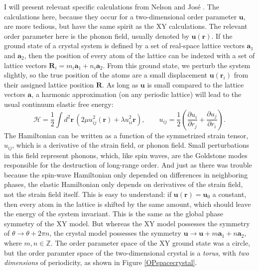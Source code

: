 \documentclass[a4paper,10pt]{article}
\newcommand{\beq}{\begin{equation}}
\newcommand{\eeq}{\end{equation}}
\renewcommand{\th}{\theta}
\newcommand{\lam}{\lambda}
\newcommand{\pder}[2]{\frac{\partial {#1}}{\partial {#2}}}
\newcommand{\paren}[1]{\left(#1\right)}
\newcommand{\goto}{\rightarrow}
\newcommand{\half}[1]{\frac{#1}{2}}
\newcommand{\bv}[1]{\mathbf{#1}}
\newcommand{\br}{\ensuremath{\bv{r}}}
\begin{document}
I will present relevant specific calculations from Nelson \cite{Nelson} and 
Jos\'e \cite{40years}. The calculations here, because they occur for a 
two-dimensional order parameter $\bv u$, are more tedious, but have the same 
spirit as the XY calculations. The relevant order parameter here is the phonon 
field, usually denoted by $\bv u(\br)$. If the ground state of a crystal system 
is defined by a set of real-space lattice vectors $\bv a_1$ and $\bv a_2$, then 
the position of every atom of the lattice can be indexed with a set of lattice 
vectors $\bv R_i = m_i \bv a_1 + n_i \bv a_2$. From this ground state, we 
perturb the system slightly, so the true position of the atoms are a small 
displacement $\bv u(\br_i)$ from their assigned lattice position $\bv R$. As 
long as $\bv u$ is small compared to the lattice vectors $\bv a$, a harmonic 
approximation (on any periodic lattice) will lead to the usual continuum elastic 
free energy:
\beq \mathcal{H} = \half{1} \int d^2\br \, \paren{ 2\mu u_{ij}^2(\br) + \lam 
u_{ii}^2{\br}}, \qquad u_{ij} = \half{1} \paren{ \pder{u_i}{r_j} + 
\pder{u_j}{r_i} }. \eeq
The Hamiltonian can be written as a function of the symmetrized strain tensor, 
$u_{ij}$, which is a derivative of the strain field, or phonon field. Small 
perturbations in this field represent phonons, which, like spin waves, are the 
Goldstone modes responsible for the destruction of long-range order. And just 
as there was trouble because the spin-wave Hamiltonian only depended on 
differences in neighboring phases, the elastic Hamiltonian only depends on 
derivatives of the strain field, not the strain field itself. This is easy to 
understand: if $\bv u(\bv r) = \bv u_0$ a constant, then every atom in the 
lattice is shifted by the same amount, which should leave the energy of the 
system invariant. This is the same as the global phase symmetry of the XY 
model. But whereas the XY model possesses the symmetry of $\th \goto \th + 2\pi 
n$, the crystal model possesses the symmetry $\bv u \goto \bv u + m \bv a_1 + 
n \bv a_2$, where $m,n \in \mathbb{Z}$. The order parameter space of the XY 
ground state was a circle, but the order paramter space of the two-dimensional 
crystal is a \emph{torus}, with \emph{two dimensions} of periodicity, as shown 
in Figure \ref{OPspacecrystal}.
\end{document}
